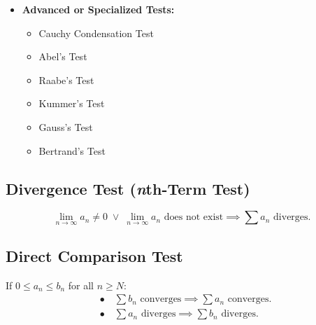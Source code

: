 \documentclass[a4paper,11pt]{article}
\theoremstyle{definition}
\theoremstyle{plain}
\theoremstyle{remark}
\begin{document}
\begin{tcolorbox}
\begin{itemize}
\begin{multicols}{2}
\begin{itemize}[label=$\circ$]
                \item Absolute Convergence Test
            \end{itemize}
        \end{multicols}
        \item \textbf{Advanced or Specialized Tests:}
        \begin{multicols}{2}
            \begin{itemize}[label=$\circ$]
                \item Cauchy Condensation Test
                \item Abel's Test 
                \item Raabe's Test
                \item Kummer's Test
                \item Gauss's Test
                \item Bertrand's Test
            \end{itemize}
        \end{multicols}
    \end{itemize}
\end{tcolorbox}




\subsection{Divergence Test (\emph{n}th-Term Test)}

\begin{tcolorbox}
    \[
    \lim_{n \to \infty} a_n \neq 0 \; \lor \; \lim_{n \to \infty} a_n \text{ does not exist} \implies \sum a_n \text{ diverges}.
    \]
\end{tcolorbox}




\subsection{Direct Comparison Test}

\begin{tcolorbox}
    If $0 \leq a_n \leq b_n$ for all $n \geq N$:
    \[
    \begin{aligned}
        &\bullet \quad \sum b_n \text{ converges} \implies \sum a_n \text{ converges}. \\[8pt]  
        &\bullet \quad \sum a_n \text{ diverges} \implies \sum b_n \text{ diverges}.
    \end{aligned}
    \]
\end{tcolorbox}
\end{document}
